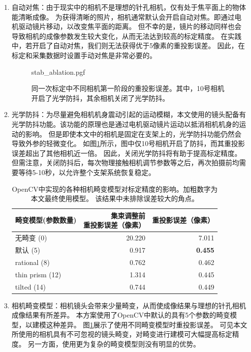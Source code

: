 \begin{enumerate}
\item 自动对焦：由于现实中的相机不是理想的针孔相机，仅有处于焦平面上的物体能清晰成像。
为获得清晰的照片，相机通常默认会开启自动对焦。即通过电机驱动镜片移动，以改变焦平面的距离。
但不幸的是，镜片的移动同样也会导致相机的成像参数发生较大变化，从而无法达到较高的标定精度。
在实践中，若开启了自动对焦，我们则无法获得优于5像素的重投影误差。
因此，在标定和采集数据时设置手动对焦是非常必要的。

\begin{figure}
    \centering
    {stab_ablation.pgf}
    \caption[不同相机的重投影误差]{同一次标定中不同相机第一阶段的重投影误差。其中，10号相机开启了光学防抖，其余相机关闭了光学防抖。}
    \label{fig:stablize_ablation}
\end{figure}

\item 光学防抖：为尽量避免相机机身震动引起的运动模糊，本文使用的镜头配备有光学防抖功能。该功能的原理也是通过电机驱动镜片运动以抵消相机机身的运动的影响。
但是即使本文中的相机是固定在支架上的，光学防抖功能仍然会导致外参的轻微变化。
如图\ref{fig:stablize_ablation}所示，图中仅10号相机开启了防抖，而其重投影误差超出了其他相机近一倍。
因此，关闭光学防抖将有助于提高标定精度。但需注意，关闭防抖后，每次物理接触相机调节参数等之后，再次拍摄前均需要等待5-10秒，以允许整个支架系统恢复稳定。

\begin{table}[htb]
    \centering
    \caption[相机畸变模型对标定精度的影响]{
        OpenCV中实现的各种相机畸变模型对标定精度的影响。加粗数字为本文最终使用模型。
        该结果中未排除误差较大的角点。
    }
    \begin{tabular}{l|rr}
        \toprule
        畸变模型(参数数量) & \shortstack{集束调整前\\重投影误差（像素）} & 重投影误差（像素） \\
        \midrule
        无畸变 (0) & 20.220 & 7.011 \\
        默认 (5) & 0.917 & \textbf{0.455} \\
        rational (8) & 0.762 & 0.462 \\
        thin prism (12) & 1.314 & 0.445 \\
        tilted (14) & 0.744 & 0.449 \\
        \bottomrule
    \end{tabular}
    \label{tab:distortion}
\end{table}

\item 相机畸变模型：相机镜头会带来少量畸变，从而使成像结果与理想的针孔相机成像结果有所差异。
本方案使用了OpenCV中默认的具有5个参数的畸变模型，以建模这种差异。
图\ref{tab:distortion}展示了使用不同畸变模型时重投影误差。
可见本文所使用的相机具有不可忽视的镜头畸变，对畸变进行建模可大幅提高标定精度。
另一方面，使用更为复杂的畸变模型则没有明显的优势。


\end{enumerate}
